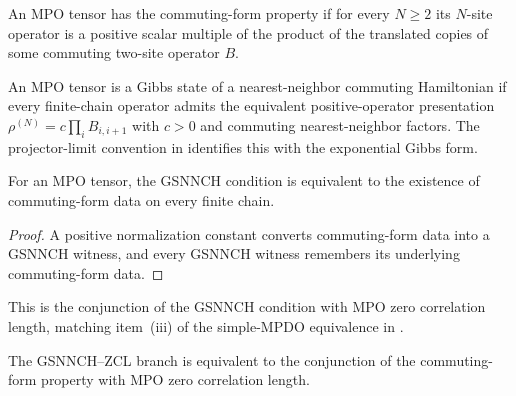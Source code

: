 \begin{definition}
    \label{def:mpdo_has_commuting_form}
    \leanok
    An MPO tensor has the commuting-form property if for every $N \ge 2$ its
    $N$-site operator is a positive scalar multiple of the product of the
    translated copies of some commuting two-site operator $B$.
\end{definition}

\begin{definition}[GSNNCH]
    \label{def:mpdo_is_gsnnch}
    \leanok
    An MPO tensor is a Gibbs state of a nearest-neighbor commuting Hamiltonian
    if every finite-chain operator admits the equivalent positive-operator
    presentation $\rho^{(N)} = c \prod_i B_{i,i+1}$ with $c > 0$ and
    commuting nearest-neighbor factors. The projector-limit convention in
    \cite{Cirac2016MPDO_arXiv}
    identifies this with the exponential Gibbs form.
\end{definition}

\begin{theorem}
    \label{thm:mpdo_is_gsnnch_iff_has_commuting_form}
    \leanok
    For an MPO tensor, the GSNNCH condition is equivalent to the existence of
    commuting-form data on every finite chain.
\end{theorem}

\begin{proof}\leanok
    A positive normalization constant converts commuting-form data into a GSNNCH
    witness, and every GSNNCH witness remembers its underlying commuting-form data.
\end{proof}

\begin{definition}
    \label{def:mpdo_is_gsnnch_zcl}
    \leanok
    This is the conjunction of the GSNNCH condition with MPO zero correlation
    length, matching item~(iii) of the simple-MPDO equivalence in
    \cite{Cirac2016MPDO_arXiv}.
\end{definition}

\begin{theorem}
    \label{thm:mpdo_is_gsnnch_zcl_iff_has_commuting_form_and_is_zcl}
    \leanok
    The GSNNCH--ZCL branch is equivalent to the conjunction of the
    commuting-form property with MPO zero correlation length.
\end{theorem}

